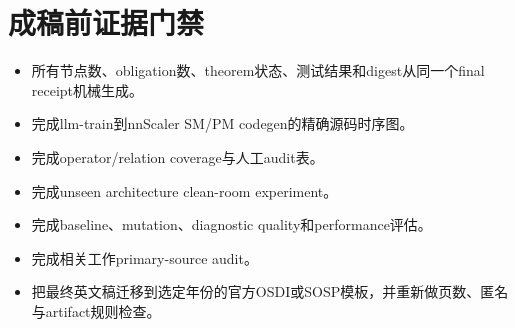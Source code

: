 \documentclass[10.5pt,a4paper]{ctexart}
\begin{document}
\section{成稿前证据门禁}

\begin{itemize}
  \item 所有节点数、obligation数、theorem状态、测试结果和digest从同一个final receipt机械生成。
  \item 完成llm-train到nnScaler SM/PM codegen的精确源码时序图。
  \item 完成operator/relation coverage与人工audit表。
  \item 完成unseen architecture clean-room experiment。
  \item 完成baseline、mutation、diagnostic quality和performance评估。
  \item 完成相关工作primary-source audit。
  \item 把最终英文稿迁移到选定年份的官方OSDI或SOSP模板，并重新做页数、匿名与artifact规则检查。
\end{itemize}
\end{document}
